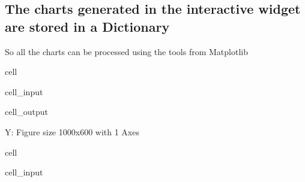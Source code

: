 \documentclass[letterpaper,10pt,english]{jupyterBook}
\begin{document}
\subsection{The charts generated in the interactive widget are stored in a Dictionary}
\label{\detokenize{content/howto/smallmodel/modelstart export up:the-charts-generated-in-the-interactive-widget-are-stored-in-a-dictionary}}
\sphinxAtStartPar
So all the charts can be processed using the tools from Matplotlib

\begin{sphinxuseclass}{cell}\begin{sphinxVerbatimInput}

\begin{sphinxuseclass}{cell_input}
\begin{sphinxVerbatim}[commandchars=\\\{\}]
   
\end{sphinxVerbatim}

\end{sphinxuseclass}\end{sphinxVerbatimInput}
\begin{sphinxVerbatimOutput}

\begin{sphinxuseclass}{cell_output}
\begin{sphinxVerbatim}[commandchars=\\\{\}]
\PYGZob{}\PYGZsq{}Y\PYGZsq{}: \PYGZlt{}Figure size 1000x600 with 1 Axes\PYGZgt{}\PYGZcb{}
\end{sphinxVerbatim}

\end{sphinxuseclass}\end{sphinxVerbatimOutput}

\end{sphinxuseclass}
\begin{sphinxuseclass}{cell}\begin{sphinxVerbatimInput}

\begin{sphinxuseclass}{cell_input}
\begin{sphinxVerbatim}[commandchars=\\\{\}]
  \PYG{p}{[}\PYG{p}{]}  
\end{sphinxVerbatim}

\end{sphinxuseclass}\end{sphinxVerbatimInput}

\end{sphinxuseclass}
\end{document}
